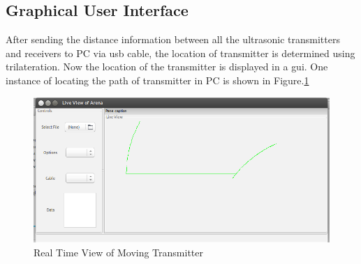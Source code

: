 \subsection{Graphical User Interface}
After sending the distance information between all the ultrasonic transmitters and receivers to PC via \gls{usb} cable, the location of transmitter is determined using trilateration. Now the location of the transmitter is displayed in a \gls{gui}. One instance of locating the path of transmitter in PC is shown in Figure.\ref{fig:LiveView}
\begin{figure}[htpb]
	\centering
	\includegraphics[scale=0.45]{Images/LiveView.png}
	\caption{Real Time View of Moving Transmitter}
	\label{fig:LiveView}
\end{figure}
